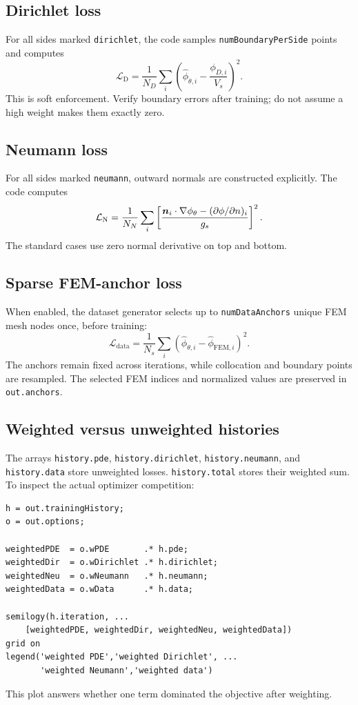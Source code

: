\documentclass[11pt]{article}
\newcommand{\phinn}{\ensuremath{\phi_{\theta}}}
\newcommand{\Ldir}{\ensuremath{\mathcal{L}_{\mathrm{D}}}}
\newcommand{\Lneu}{\ensuremath{\mathcal{L}_{\mathrm{N}}}}
\newcommand{\Ldata}{\ensuremath{\mathcal{L}_{\mathrm{data}}}}
\begin{document}
\subsection{Dirichlet loss}

For all sides marked \texttt{dirichlet}, the code samples \texttt{numBoundaryPerSide} points and computes
\begin{equation}
\Ldir=\frac{1}{N_D}\sum_i
\left(\hat{\phi}_{\theta,i}-\frac{\phi_{D,i}}{V_s}\right)^2.
\end{equation}
This is soft enforcement. Verify boundary errors after training; do not assume a high weight makes them exactly zero.

\subsection{Neumann loss}

For all sides marked \texttt{neumann}, outward normals are constructed explicitly. The code computes
\begin{equation}
\Lneu=\frac{1}{N_N}\sum_i
\left[
\frac{\nvec_i\cdot\nabla\phinn-(\partial\phi/\partial n)_i}{g_s}
\right]^2.
\end{equation}
The standard cases use zero normal derivative on top and bottom.

\subsection{Sparse FEM-anchor loss}

When enabled, the dataset generator selects up to \texttt{numDataAnchors} unique FEM mesh nodes once, before training:
\begin{equation}
\Ldata=\frac{1}{N_s}\sum_i
\left(\hat{\phi}_{\theta,i}-\hat{\phi}_{\mathrm{FEM},i}\right)^2.
\end{equation}
The anchors remain fixed across iterations, while collocation and boundary points are resampled. The selected FEM indices and normalized values are preserved in \texttt{out.anchors}.

\subsection{Weighted versus unweighted histories}

The arrays \texttt{history.pde}, \texttt{history.dirichlet}, \texttt{history.neumann}, and \texttt{history.data} store unweighted losses. \texttt{history.total} stores their weighted sum. To inspect the actual optimizer competition:
\begin{lstlisting}[style=projectmatlab]
h = out.trainingHistory;
o = out.options;

weightedPDE  = o.wPDE       .* h.pde;
weightedDir  = o.wDirichlet .* h.dirichlet;
weightedNeu  = o.wNeumann   .* h.neumann;
weightedData = o.wData      .* h.data;

semilogy(h.iteration, ...
    [weightedPDE, weightedDir, weightedNeu, weightedData])
grid on
legend('weighted PDE','weighted Dirichlet', ...
       'weighted Neumann','weighted data')
\end{lstlisting}
This plot answers whether one term dominated the objective after weighting.
\end{document}
